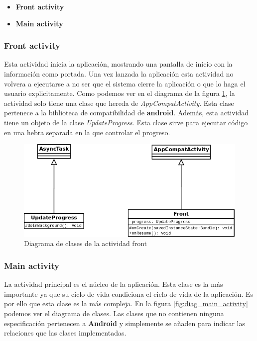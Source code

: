 \begin{itemize}
  \item \textbf{Front activity}
  \item \textbf{Main activity}
\end{itemize}

\subsubsection{Front activity}

Esta actividad inicia la aplicación, mostrando una pantalla de inicio con la información como portada. Una vez lanzada la aplicación esta actividad no volvera a ejecutarse a no ser que el sistema cierre la aplicación o que lo haga el usuario explicitamente. Como podemos ver en el diagrama de la figura \ref{fig:diag_front}, la actividad solo tiene una clase que hereda de \textit{AppCompatActivity}. Esta clase pertenece a la biblioteca de compatibilidad de \textbf{android}. Además, esta actividad tiene un objeto de la clase \textit{UpdateProgress}. Esta clase sirve para ejecutar código en una hebra separada en la que controlar el progreso.

\bigskip
\begin{figure}[!ht]
  \begin{center}
  \includegraphics[width=1\textwidth]{../images/front_diag.png}
  \caption{Diagrama de clases de la actividad front}
  \label{fig:diag_front}
  \end{center}
\end{figure}


\subsubsection{Main activity}

La actividad principal es el núcleo de la aplicación. Esta clase es la más importante ya que su ciclo de vida condiciona el ciclo de vida de la aplicación. Es por ello que esta clase es la más compleja. En la figura \ref{fig:diag_main_activity} podemos ver el diagrama de clases. Las clases que no contienen ninguna especificación pertenecen a \textbf{Android} y simplemente se añaden para indicar las relaciones que las clases implementadas.

